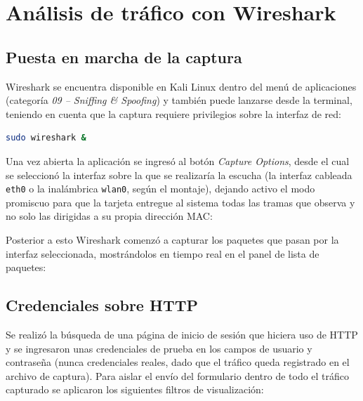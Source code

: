 \section{Análisis de tráfico con Wireshark}

\subsection{Puesta en marcha de la captura}

Wireshark se encuentra disponible en Kali Linux dentro del menú de aplicaciones (categoría \emph{09 -- Sniffing \& Spoofing}) y también puede lanzarse desde la terminal, teniendo en cuenta que la captura requiere privilegios sobre la interfaz de red:

\begin{lstlisting}[language=bash]
sudo wireshark &
\end{lstlisting}

Una vez abierta la aplicación se ingresó al botón \emph{Capture Options}, desde el cual se seleccionó la interfaz sobre la que se realizaría la escucha (la interfaz cableada \texttt{eth0} o la inalámbrica \texttt{wlan0}, según el montaje), dejando activo el modo promiscuo para que la tarjeta entregue al sistema todas las tramas que observa y no solo las dirigidas a su propia dirección MAC:


\begin{analisis}
\end{analisis}

Posterior a esto Wireshark comenzó a capturar los paquetes que pasan por la interfaz seleccionada, mostrándolos en tiempo real en el panel de lista de paquetes:


\begin{analisis}
\end{analisis}

\subsection{Credenciales sobre HTTP}

Se realizó la búsqueda de una página de inicio de sesión que hiciera uso de HTTP y se ingresaron unas credenciales de prueba en los campos de usuario y contraseña (nunca credenciales reales, dado que el tráfico queda registrado en el archivo de captura). Para aislar el envío del formulario dentro de todo el tráfico capturado se aplicaron los siguientes filtros de visualización:

